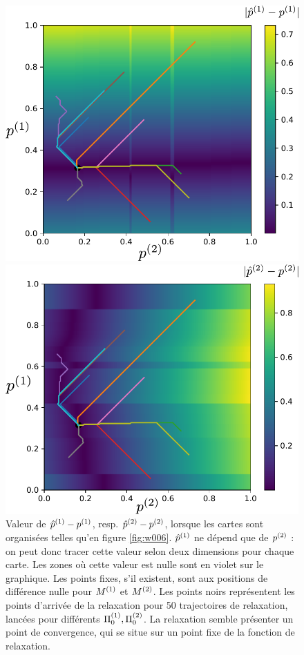 \documentclass[../main]{subfiles}
\begin{document}
\begin{figure}
\begin{minipage}{0.5\textwidth}
\centering
\includegraphics[width=\textwidth]{champ_X_006.pdf}
\end{minipage}
\begin{minipage}{0.5\textwidth}
\centering
\includegraphics[width=\textwidth]{champ_Y_006.pdf}
\end{minipage}
\caption{Valeur de ${\hat{p}}^{({1})} - p^{({1})}$, resp. ${\hat{p}}^{({2})} - p^{({2})}$, lorsque les cartes sont organisées telles qu'en figure \ref{fig:w006}. ${\hat{p}}^{({1})}$ ne dépend que de $p^{({2})}$ : on peut donc tracer cette valeur selon deux dimensions pour chaque carte. Les zones où cette valeur est nulle sont en violet sur le graphique. Les points fixes, s'il existent, sont aux positions de différence nulle pour $M^{({1})}$ et $M^{({2})}$. Les points noirs représentent les points d'arrivée de la relaxation pour 50 trajectoires de relaxation, lancées pour différents $\Pi_0^{({1})}, \Pi_0^{({2})}$. La relaxation semble présenter un point de convergence, qui se situe sur un point fixe de la fonction de relaxation.}
\label{fig:diff_relax_notraj}
\end{figure}
\end{document}
